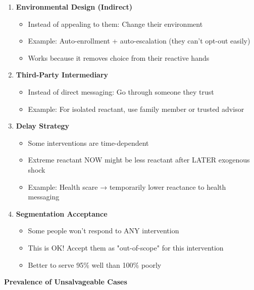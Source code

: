 \begin{enumerate}
\item \textbf{Environmental Design (Indirect)}
  \begin{itemize}[nosep]
  \item Instead of appealing to them: Change their environment
  \item Example: Auto-enrollment + auto-escalation (they can't opt-out easily)
  \item Works because it removes choice from their reactive hands
  \end{itemize}

\item \textbf{Third-Party Intermediary}
  \begin{itemize}[nosep]
  \item Instead of direct messaging: Go through someone they trust
  \item Example: For isolated reactant, use family member or trusted advisor
  \end{itemize}

\item \textbf{Delay Strategy}
  \begin{itemize}[nosep]
  \item Some interventions are time-dependent
  \item Extreme reactant NOW might be less reactant after LATER exogenous shock
  \item Example: Health scare → temporarily lower reactance to health messaging
  \end{itemize}

\item \textbf{Segmentation Acceptance}
  \begin{itemize}[nosep]
  \item Some people won't respond to ANY intervention
  \item This is OK! Accept them as "out-of-scope" for this intervention
  \item Better to serve 95\% well than 100\% poorly
  \end{itemize}
\end{enumerate}

\textbf{Prevalence of Unsalvageable Cases}

